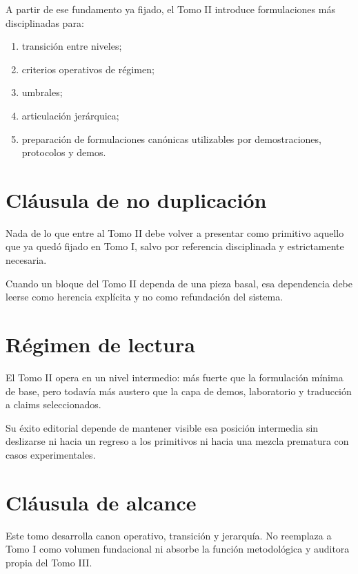 \begin{observation}
A partir de ese fundamento ya fijado, el Tomo II introduce formulaciones más disciplinadas para:
\begin{enumerate}
  \item transición entre niveles;
  \item criterios operativos de régimen;
  \item umbrales;
  \item articulación jerárquica;
  \item preparación de formulaciones canónicas utilizables por demostraciones, protocolos y demos.
\end{enumerate}
\end{observation}

\section{Cláusula de no duplicación}
\begin{observation}
Nada de lo que entre al Tomo II debe volver a presentar como primitivo aquello que ya quedó fijado en Tomo I, salvo por referencia disciplinada y estrictamente necesaria.
\end{observation}

\begin{observation}
Cuando un bloque del Tomo II dependa de una pieza basal, esa dependencia debe leerse como herencia explícita y no como refundación del sistema.
\end{observation}

\section{Régimen de lectura}
\begin{observation}
El Tomo II opera en un nivel intermedio: más fuerte que la formulación mínima de base, pero todavía más austero que la capa de demos, laboratorio y traducción a claims seleccionados.
\end{observation}

\begin{observation}
Su éxito editorial depende de mantener visible esa posición intermedia sin deslizarse ni hacia un regreso a los primitivos ni hacia una mezcla prematura con casos experimentales.
\end{observation}

\section{Cláusula de alcance}
\begin{observation}
Este tomo desarrolla canon operativo, transición y jerarquía. No reemplaza a Tomo I como volumen fundacional ni absorbe la función metodológica y auditora propia del Tomo III.
\end{observation}

